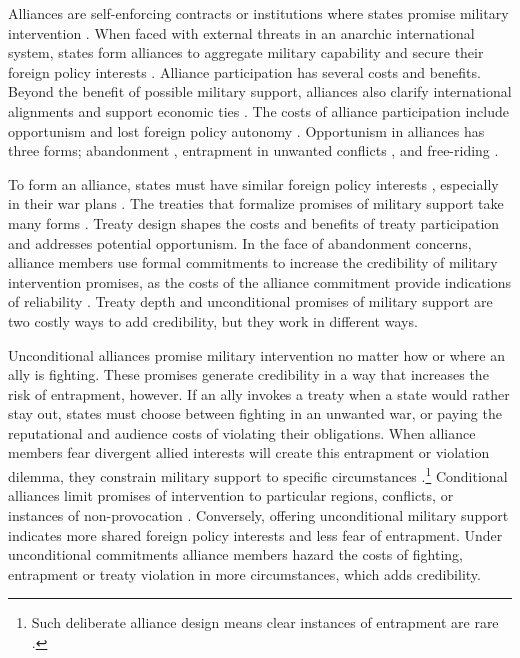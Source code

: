 \documentclass[12pt]{article}
\begin{document}
Alliances are self-enforcing contracts or institutions where states promise military intervention \citep{Leedsetal2002, Morrow2000}. 
When faced with external threats in an anarchic international system, states form alliances to aggregate military capability and secure their foreign policy interests \citep{Altfield1984, Smith1995, Snyder1997, FordhamPoast2014}.
Alliance participation has several costs and benefits.
Beyond the benefit of possible military support, alliances also clarify international alignments \citep{Snyder1990} and support economic ties \citep{Gowa1995, Li2003, Long2003, Fordham2010, WolfordKim2017}.  
The costs of alliance participation include opportunism and lost foreign policy autonomy \citep{Altfield1984, Morrow2000, Johnson2015}. 
Opportunism in alliances has three forms; abandonment \citep{Leeds2003a, BerkemeierFuhrmann2018}, entrapment in unwanted conflicts \citep{Snyder1984}, and free-riding \citep{Morrow2000}.


To form an alliance, states must have similar foreign policy interests \citep{Morrow1991, Smith1995, FordhamPoast2014}, especially in their war plans \citep{Poast2019a}. 
The treaties that formalize promises of military support take many forms \citep{Leedsetal2000, Leedsetal2002, Benson2012, BensonClinton2016}. 
Treaty design shapes the costs and benefits of treaty participation and addresses potential opportunism.  
In the face of abandonment concerns, alliance members use formal commitments to increase the credibility of military intervention promises, as the costs of the alliance commitment provide indications of reliability \citep{Morrow2000}. 
Treaty depth and unconditional promises of military support are two costly ways to add credibility, but they work in different ways.  


Unconditional alliances promise military intervention no matter how or where an ally is fighting. 
These promises generate credibility in a way that increases the risk of entrapment, however. 
If an ally invokes a treaty when a state would rather stay out, states must choose between fighting in an unwanted war, or paying the reputational \citep{Gibler2008, Crescenzietal2012} and audience \citep{Fearon1997} costs of violating their obligations.
When alliance members fear divergent allied interests will create this entrapment or violation dilemma, they constrain military support to specific circumstances \citep{Kim2011, Benson2012}.\footnote{Such deliberate alliance design means clear instances of entrapment are rare \citep{Kim2011, Beckley2015}.} 
Conditional alliances limit promises of intervention to particular regions, conflicts, or instances of non-provocation \citep{Leedsetal2000}. 
Conversely, offering unconditional military support indicates more shared foreign policy interests and less fear of entrapment.
Under unconditional commitments alliance members hazard the costs of fighting, entrapment or treaty violation in more circumstances, which adds credibility.  
\end{document}
